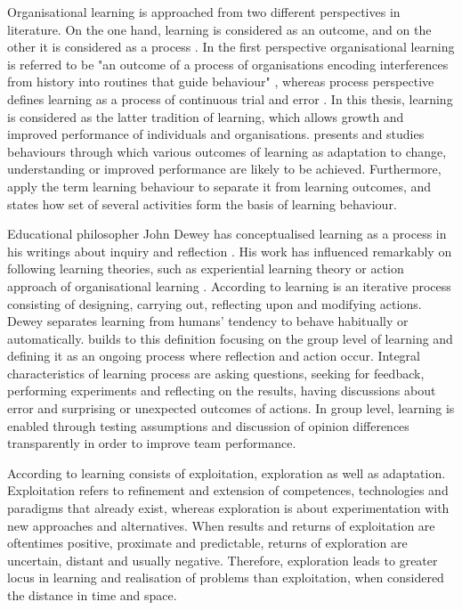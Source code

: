 Organisational learning is approached from two different perspectives in literature. On the one hand, learning is considered as an outcome, and on the other it is considered as a process \citep{edmondson1999psychological}. In the first perspective organisational learning is referred to be "an outcome of a process of organisations encoding interferences from history into routines that guide behaviour" \citep{levitt1988organizational}, whereas process perspective defines learning as a process of continuous trial and error \citep{argyris1978organizational}. In this thesis, learning is considered as the latter tradition of learning, which allows growth and improved performance of individuals and organisations. \citet{edmondson1999psychological} presents and studies behaviours through which various outcomes of learning as adaptation to change, understanding or improved performance are likely to be achieved. Furthermore, \citet{edmondson1999psychological} apply the term learning behaviour to separate it from learning outcomes, and states how set of several activities form the basis of learning behaviour. 

Educational philosopher John Dewey has conceptualised learning as a process in his writings about inquiry and reflection \citep{dewey1956human}. His work has influenced remarkably on following learning theories, such as experiential learning theory \citep{kolb1984experiential} or action approach of organisational learning \citep{schon1983reflective}. According to \citet{dewey1956human} learning is an iterative process consisting of designing, carrying out, reflecting upon and modifying actions. Dewey separates learning from humans' tendency to behave habitually or automatically. \citet{edmondson1999psychological} builds to this definition focusing on the group level of learning and defining it as an ongoing process where reflection and action occur. Integral characteristics of learning process are asking questions, seeking for feedback, performing experiments and reflecting on the results, having discussions about error and surprising or unexpected outcomes of actions. In group level, learning is enabled through testing assumptions and discussion of opinion differences transparently in order to improve team performance. \citep{edmondson1999psychological} 

According to \citet{march1991exploration} learning consists of exploitation, exploration as well as adaptation. Exploitation refers to refinement and extension of competences, technologies and paradigms that already exist, whereas exploration is about experimentation with new approaches and alternatives. When results and returns of exploitation are oftentimes positive, proximate and predictable, returns of exploration are uncertain, distant and usually negative. Therefore, exploration leads to greater locus in learning and realisation of problems than exploitation, when considered the distance in time and space. \citep{march1991exploration}


